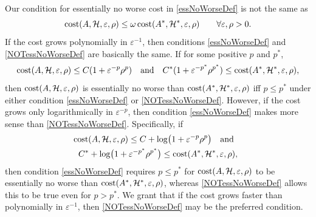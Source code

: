 \documentclass[graybox,footinfo]{svmult}
\begin{document}
Our condition for essentially no worse cost in \eqref{essNoWorseDef} is not the same as 
\begin{equation} \label{NOTessNoWorseDef}
    \textup{cost}(A,\calH,\varepsilon,\rho)
    \le 
    \omega \, \textup{cost}(A^*,\calH^*,\varepsilon,\rho)
    \qquad \forall \varepsilon,\rho > 0.
\end{equation}
If the cost grows polynomially in $\varepsilon^{-1}$, then conditions \eqref{essNoWorseDef} and \eqref{NOTessNoWorseDef} are basically the same.  If for some positive $p$ and $p^*$,
\[
\textup{cost}(A,{\mathcal{H}},\varepsilon,\rho) \le  C (1+\varepsilon^{-p}\rho^p) \quad \text{and} \quad C^* (1+\varepsilon^{-p^*}\rho^{p^*}) \le \textup{cost}(A^*,{\mathcal{H}}^*,\varepsilon,\rho),
\]
then $\textup{cost}(A,{\mathcal{H}},\varepsilon,\rho)$ is essentially no worse than $\textup{cost}(A^*,{\mathcal{H}}^*,\varepsilon,\rho)$ iff $p \le p^*$ under either condition \eqref{essNoWorseDef} or \eqref{NOTessNoWorseDef}.  However, if the cost grows only logarithmically in $\varepsilon^{-p}$, then condition \eqref{essNoWorseDef} makes more sense than \eqref{NOTessNoWorseDef}. Specifically, if
\begin{multline*}
\textup{cost}(A,{\mathcal{H}},\varepsilon,\rho) \le  C + \log\bigl(1 + \varepsilon^{-p}\rho^p\bigr) \quad \text{and} \quad
\\ C^* + \log\bigl(1+\varepsilon^{-p^*}\rho^{p^*}\bigr) \le \textup{cost}(A^*,{\mathcal{H}}^*,\varepsilon,\rho),
\end{multline*}
then condition  \eqref{essNoWorseDef} requires $p \le p^*$ for  $\textup{cost}(A,{\mathcal{H}},\varepsilon,\rho)$ to be essentially no worse than $\textup{cost}(A^*,{\mathcal{H}}^*,\varepsilon,\rho)$, whereas \eqref{NOTessNoWorseDef} allows this to be true even for $p > p^*$.  We grant that if the cost grows faster than polynomially in $\varepsilon^{-1}$, then \eqref{NOTessNoWorseDef} may be the preferred condition.
\end{document}

